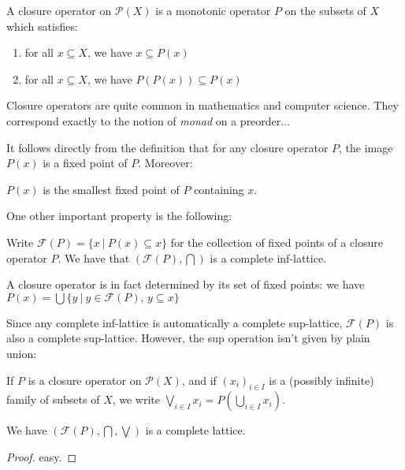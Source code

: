\begin{definition}
A closure operator on $\mathcal{P}(X)$ is a monotonic operator $P$ on the subsets of $X$ which satisfies:
\begin{enumerate}
\item for all $x\subseteq X$, we have $x\subseteq P(x)$
\item for all $x\subseteq X$, we have $P(P(x))\subseteq P(x)$
\end{enumerate}
\end{definition}

Closure operators are quite common in mathematics and computer science.
They correspond exactly to the notion of \emph{monad} on a preorder...

It follows directly from the definition that for any closure operator
\(P\), the image \(P(x)\) is a fixed point of \(P\). Moreover:

\begin{lemma}
$P(x)$ is the smallest fixed point of $P$ containing $x$.
\end{lemma}

One other important property is the following:

\begin{lemma}
Write $\mathcal{F}(P) = \{x\ |\ P(x)\subseteq x\}$ for the collection of fixed points of a closure operator $P$. We have that $\left(\mathcal{F}(P),\bigcap\right)$ is a complete inf-lattice.
\end{lemma}

\begin{remark}
A closure operator is in fact determined by its set of fixed points: we have $P(x) = \bigcup \{ y\ |\ y\in\mathcal{F}(P),\,y\subseteq x\}$
\end{remark}

Since any complete inf-lattice is automatically a complete sup-lattice,
\(\mathcal{F}(P)\) is also a complete sup-lattice. However, the sup
operation isn't given by plain union:

\begin{lemma}
If $P$ is a closure operator on $\mathcal{P}(X)$, and if $(x_i)_{i\in I}$ is a (possibly infinite) family of subsets of $X$, we write $\bigvee_{i\in I} x_i = P\left(\bigcup_{i\in I} x_i\right)$.

We have $\left(\mathcal{F}(P),\bigcap,\bigvee\right)$ is a complete lattice.
\end{lemma}

\begin{proof}
easy.
\end{proof}

